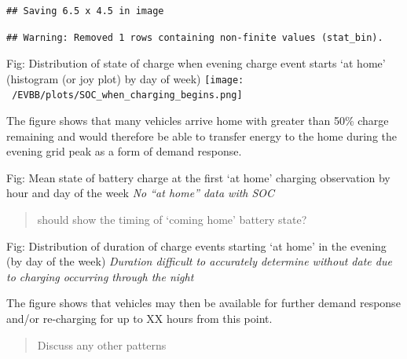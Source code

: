 \documentclass[]{article}
\begin{document}
\begin{verbatim}
## Saving 6.5 x 4.5 in image
\end{verbatim}

\begin{verbatim}
## Warning: Removed 1 rows containing non-finite values (stat_bin).
\end{verbatim}

Fig: Distribution of state of charge when evening charge event starts
`at home' (histogram (or joy plot) by day of week)
\texttt{[image: ~/EVBB/plots/SOC\_when\_charging\_begins.png]}

The figure shows that many vehicles arrive home with greater than 50\%
charge remaining and would therefore be able to transfer energy to the
home during the evening grid peak as a form of demand response.

Fig: Mean state of battery charge at the first `at home' charging
observation by hour and day of the week \emph{No ``at home'' data with
SOC}

\begin{quote}
should show the timing of `coming home' battery state?
\end{quote}

Fig: Distribution of duration of charge events starting `at home' in the
evening (by day of the week) \emph{Duration difficult to accurately
determine without date due to charging occurring through the night}

The figure shows that vehicles may then be available for further demand
response and/or re-charging for up to XX hours from this point.

\begin{quote}
Discuss any other patterns
\end{quote}
\end{document}
